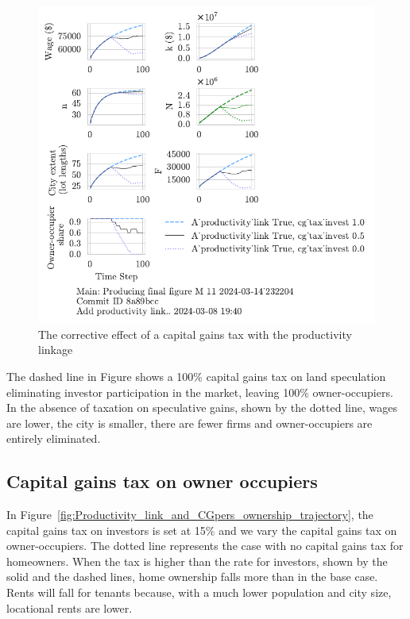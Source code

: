 \begin{figure}[h!tb]\label{fig-Productivity_link_and_CG}
    \centering
     \includegraphics[scale=1, trim=.25cm 2cm .25cm .25cm, clip]{fig/With-productivity_linkcg_tax_invest-232204.pdf}
    \caption{The corrective effect of a capital gains tax with the productivity linkage}
    \label{fig:Productivity_link_and_CG}
\end{figure}

The dashed line in Figure shows a 100\% capital gains tax on land speculation eliminating investor participation in the market, leaving 100\%  owner-occupiers.  In the absence of taxation on speculative gains, shown by the dotted line, wages are lower, the city is smaller, there are fewer firms and owner-occupiers are entirely eliminated. 

\newpage
\subsection{Capital gains tax on owner occupiers}
In Figure~\ref{fig:Productivity_link_and_CGpers_ownership_trajectory}, the capital gains tax on investors is set at 15\% and we vary the capital gains tax on owner-occupiers. The dotted line represents the case with no capital gains tax for homeowners. When the tax is higher than the rate for investors, shown by the solid and the dashed lines,  home ownership falls more than in the base case.  Rents will fall for tenants because, with a much lower population and city size, locational rents are lower.


